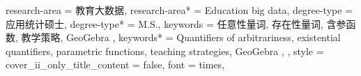 {{      %
    research-area = {教育大数据},
    research-area* = {Education big data},
    degree-type = {应用统计硕士},
    degree-type* = {M.S.},
    keywords = {
      任意性量词, 存在性量词, 含参函数, 教学策略, GeoGebra
    },
    keywords* = {
      Quantifiers of arbitrariness, existential quantifiers, parametric functions, teaching strategies, GeoGebra
    },
  },
  style = {
    cover_ii_only_title_content = false,
    font = times,
}}
